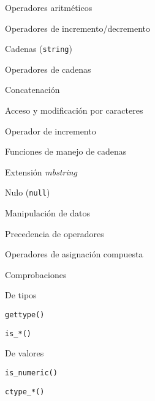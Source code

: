 \begin{longenum}
\begin{longenum}
\begin{longenum}
\begin{longenum}
                \begin{longenum}
                    \item Operadores aritméticos
                    \item Operadores de incremento/decremento
                \end{longenum}
            \end{longenum}
            \item Cadenas (\texttt{string})
            \begin{longenum}
                \item Operadores de cadenas
                \begin{longenum}
                    \item Concatenación
                    \item Acceso y modificación por caracteres
                    \item Operador de incremento \opcional\
                \end{longenum}
                \item Funciones de manejo de cadenas
                \item Extensión \textit{mbstring}
            \end{longenum}
            \item Nulo (\texttt{null})
        \end{longenum}
        \item Manipulación de datos
        \begin{longenum}
            \item Precedencia de operadores
            \item Operadores de asignación compuesta
            \item Comprobaciones
            \begin{longenum}
                \item De tipos
                \begin{longenum}
                    \item \texttt{gettype()}
                    \item \texttt{is\_*()}
                \end{longenum}
                \item De valores
                \begin{longenum}
                    \item \texttt{is\_numeric()}
                    \item \texttt{ctype\_*()}

\end{longenum}
\end{longenum}
\end{longenum}
\end{longenum}
\end{longenum}
